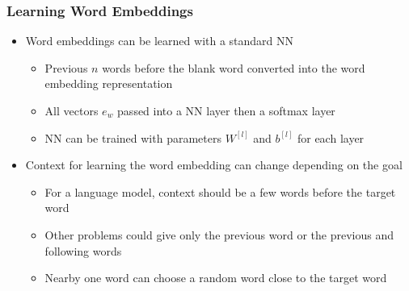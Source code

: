 \documentclass[12pt, letterpaper]{article}
\begin{document}
    \subsubsection{Learning Word Embeddings}
    \begin{itemize}
        \item Word embeddings can be learned with a standard NN
        \begin{itemize}
            \item Previous $n$ words before the blank word converted into the word embedding representation
            \item All vectors $e_w$ passed into a NN layer then a softmax layer
            \item NN can be trained with parameters $W^{[l]}$ and $b^{[l]}$ for each layer
        \end{itemize}
        \item Context for learning the word embedding can change depending on the goal
        \begin{itemize}
            \item For a language model, context should be a few words before the target word
            \item Other problems could give only the previous word or the previous and following words
            \item Nearby one word can choose a random word close to the target word
        \end{itemize}
    \end{itemize}
\end{document}
